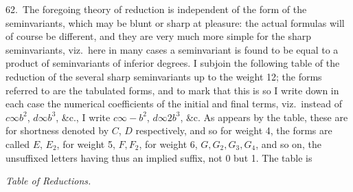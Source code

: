 \documentclass[11pt]{article}
\begin{document}
62.\ The foregoing theory of reduction is independent of the form of the seminvariants, which may be blunt or sharp at pleasure: the actual formulas will of course be different, and they are very much more simple for the sharp seminvariants, viz.\ here in many cases a seminvariant is found to be equal to a product of seminvariants of inferior degrees. I subjoin the following table of the reduction of the several sharp seminvariants up to the weight 12; the forms referred to are the tabulated forms, and to mark that this is so I write down in each case the numerical coefficients of the initial and final terms, viz.\ instead of $c \infty b^2$, $d \infty b^3$, \&c., I write $c \infty - b^2$, $d \infty 2b^3$, \&c. As appears by the table, these are for shortness denoted by $C$, $D$ respectively, and so for weight 4, the forms are called $E$, $E_2$, for weight 5, $F, F_2$, for weight 6, $G, G_2, G_3, G_4$, and so on, the unsuffixed letters having thus an implied suffix, not 0 but 1. The table is

\clearpage
\begin{center}
\textit{Table of Reductions.}
\end{center}
\end{document}

